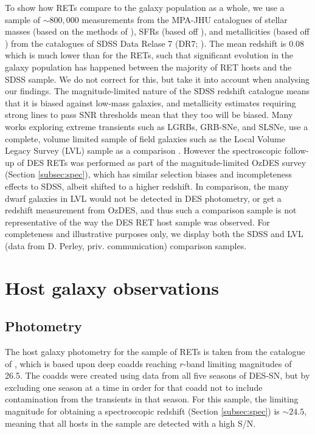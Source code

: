 \documentclass[fleqn,usenatbib,]{mnras}
\newcommand{\replyref}[1]{\color{magenta}#1 \color{black}}
\begin{document}
To show how RETs compare to the galaxy population as a whole, we use a sample of $\sim800,000$ measurements from the MPA-JHU catalogues of stellar masses (based on the methods of \citealt{Kauffmann2003,Salim2007}), SFRs (based off \citealt{Brinchmann2004}), and metallicities (based off \citealt{Tremonti2004}) from the  catalogues of SDSS Data Relase 7 (DR7; \citealt{Abazajian2009}). The mean redshift is 0.08 which is much lower than for the RETs, such that significant evolution in the galaxy population has happened between the majority of RET hosts and the SDSS sample. We do not correct for this, but take it into account when analysing our findings. \replyref{The magnitude-limited nature of the SDSS redshift catalogue means that it is biased against low-mass galaxies, and metallicity estimates requiring strong lines to pass SNR thresholds mean that they too will be biased. Many works exploring extreme transients such as LGRBs, GRB-SNe, and SLSNe, use a complete, volume limited sample of field galaxies such as the Local Volume Legacy Survey (LVL) sample as a comparison \citep[e.g.][]{Chen2017,Modjaz2019,Taggart2019}. However the spectroscopic follow-up of DES RETs was performed as part of the magnitude-limited OzDES survey (Section \ref{subsec:spec}), which has similar selection biases and incompleteness effects to SDSS, albeit shifted to a higher redshift. In comparison, the many dwarf galaxies in LVL would not be detected in DES photometry, or get a redshift measurement from OzDES, and thus such a comparison sample is not representative of the way the DES RET host sample was observed. For completeness and illustrative purposes only, we display both the SDSS and LVL (data from D. Perley, priv. communication) comparison samples.} 

\section{Host galaxy observations}
\label{sec:obs}
\subsection{Photometry \label{subsec:phot}}

The host galaxy photometry for the sample of RETs is taken from the catalogue of , which is based upon deep coadds reaching $r$-band limiting magnitudes of 26.5. The coadds were created using data from all five seasons of DES-SN, but by excluding one season at a time in order for that coadd not to include contamination from the transients in that season. For this sample, the limiting magnitude for obtaining a spectroscopic redshift (Section \ref{subsec:spec}) is $\sim 24.5$, meaning that all hosts in the sample are detected with a high S/N.
\end{document}
